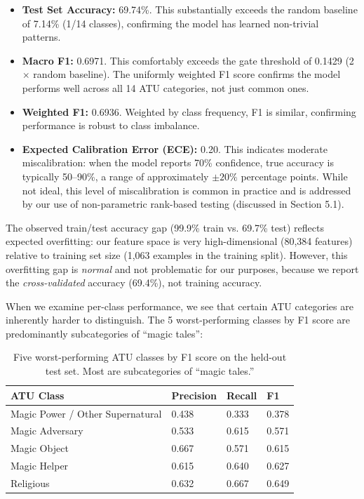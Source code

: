 \documentclass{article}
\begin{document}
\begin{itemize}
\item \textbf{Test Set Accuracy:} 69.74\%. This substantially exceeds the random baseline of 7.14\% (1/14 classes), confirming the model has learned non-trivial patterns.
\item \textbf{Macro F1:} 0.6971. This comfortably exceeds the gate threshold of 0.1429 (2$\times$ random baseline). The uniformly weighted F1 score confirms the model performs well across all 14 ATU categories, not just common ones.
\item \textbf{Weighted F1:} 0.6936. Weighted by class frequency, F1 is similar, confirming performance is robust to class imbalance.
\item \textbf{Expected Calibration Error (ECE):} 0.20. This indicates moderate miscalibration: when the model reports 70\% confidence, true accuracy is typically 50--90\%, a range of approximately $\pm 20\% $ percentage points. While not ideal, this level of miscalibration is common in practice and is addressed by our use of non-parametric rank-based testing (discussed in Section 5.1).
\end{itemize}

The observed train/test accuracy gap (99.9\% train vs. 69.7\% test) reflects expected overfitting: our feature space is very high-dimensional (80,384 features) relative to training set size (1,063 examples in the training split). However, this overfitting gap is \textit{normal} and not problematic for our purposes, because we report the \textit{cross-validated} accuracy (69.4\%), not training accuracy.

When we examine per-class performance, we see that certain ATU categories are inherently harder to distinguish. The 5 worst-performing classes by F1 score are predominantly subcategories of ``magic tales'':

\begin{table}[h]
\centering
\small
\begin{tabular}{llll}
\toprule
\textbf{ATU Class} & \textbf{Precision} & \textbf{Recall} & \textbf{F1} \\
\midrule
Magic Power / Other Supernatural & 0.438 & 0.333 & 0.378 \\
Magic Adversary & 0.533 & 0.615 & 0.571 \\
Magic Object & 0.667 & 0.571 & 0.615 \\
Magic Helper & 0.615 & 0.640 & 0.627 \\
Religious & 0.632 & 0.667 & 0.649 \\
\bottomrule
\end{tabular}
\caption{Five worst-performing ATU classes by F1 score on the held-out test set. Most are subcategories of ``magic tales.''}
\label{tab:worst_classes}
\end{table}
\end{document}
